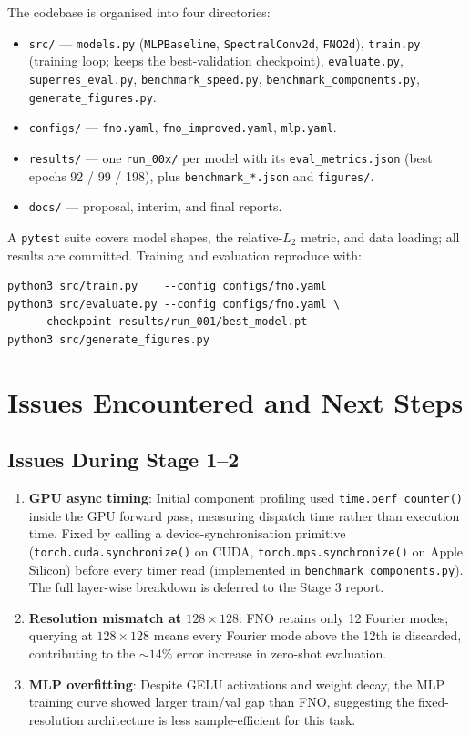 \documentclass[11pt,a4paper]{article}
\begin{document}
The codebase is organised into four directories:
\begin{itemize}[nosep]
  \item \texttt{src/} --- \texttt{models.py} (\texttt{MLPBaseline}, \texttt{SpectralConv2d}, \texttt{FNO2d}), \texttt{train.py} (training loop; keeps the best-validation checkpoint), \texttt{evaluate.py}, \texttt{superres\_eval.py}, \texttt{benchmark\_speed.py}, \texttt{benchmark\_components.py}, \texttt{generate\_figures.py}.
  \item \texttt{configs/} --- \texttt{fno.yaml}, \texttt{fno\_improved.yaml}, \texttt{mlp.yaml}.
  \item \texttt{results/} --- one \texttt{run\_00x/} per model with its \texttt{eval\_metrics.json} (best epochs 92 / 99 / 198), plus \texttt{benchmark\_*.json} and \texttt{figures/}.
  \item \texttt{docs/} --- proposal, interim, and final reports.
\end{itemize}
A \texttt{pytest} suite covers model shapes, the relative-$L_2$ metric, and data loading; all results are committed. Training and evaluation reproduce with:
\begin{verbatim}
python3 src/train.py    --config configs/fno.yaml
python3 src/evaluate.py --config configs/fno.yaml \
    --checkpoint results/run_001/best_model.pt
python3 src/generate_figures.py
\end{verbatim}

\section{Issues Encountered and Next Steps}

\subsection{Issues During Stage 1--2}
\begin{enumerate}[nosep]
  \item \textbf{GPU async timing}: Initial component profiling used \texttt{time.perf\_counter()} inside the GPU forward pass, measuring dispatch time rather than execution time. Fixed by calling a device-synchronisation primitive (\texttt{torch.cuda.synchronize()} on CUDA, \texttt{torch.mps.synchronize()} on Apple Silicon) before every timer read (implemented in \texttt{benchmark\_components.py}). The full layer-wise breakdown is deferred to the Stage 3 report.
  \item \textbf{Resolution mismatch at $128\times128$}: FNO retains only 12 Fourier modes; querying at $128\times128$ means every Fourier mode above the 12th is discarded, contributing to the $\sim14\%$ error increase in zero-shot evaluation.
  \item \textbf{MLP overfitting}: Despite GELU activations and weight decay, the MLP training curve showed larger train/val gap than FNO, suggesting the fixed-resolution architecture is less sample-efficient for this task.
\end{enumerate}
\end{document}
